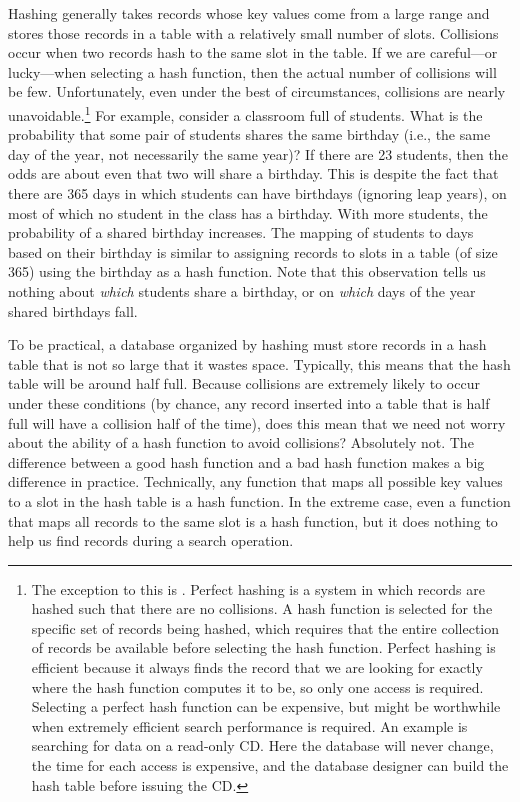 Hashing generally takes records whose key values come from a
large range and stores those records in a table
with a relatively small number of slots.
Collisions occur when two records hash to the same slot in the
table.
If we are careful---or lucky---when selecting a hash function, then
the actual number of collisions will be few.
Unfortunately, even under the best of circumstances, collisions are
nearly unavoidable.\footnote{The exception to this is .
Perfect hashing is a system in which records are hashed such that
there are no collisions.
A hash function is selected for the specific set
of records being hashed, which requires that the entire collection of
records be available before selecting the hash function.
Perfect hashing is efficient because it always finds the record that
we are looking for exactly where the hash function computes it to
be, so only one access is required.
Selecting a perfect hash function can be expensive, but might be
worthwhile when extremely efficient search performance is required.
An example is searching for data on a read-only CD.
Here the database will never change, the time for each access is
expensive, and the database designer can build the hash table before
issuing the CD.}
For example, consider a classroom full of students.
What is the probability that some pair of students
shares the same birthday (i.e., the same day of the year, not
necessarily the same year)?
If there are 23 students, then the odds are about even that two will
share a birthday.
This is despite the fact that there are 365 days in which students
can have birthdays (ignoring leap years), on most of which no student
in the class has a birthday.
With more students, the probability of a shared birthday increases.
The mapping of students to days based on their birthday is similar to
assigning records to slots in a table (of size 365) using the
birthday as a hash function.
Note that this observation tells us nothing about \emph{which}
students share a birthday, or on \emph{which} days of the year shared
birthdays fall.

To be practical, a database organized by hashing must store records in a
hash table that is not so large that it wastes space.
Typically, this means that the hash table will be around half full.
Because collisions are extremely likely to occur under these
conditions (by chance, any record inserted into a table that is half
full will have a collision half of the time),
does this mean that we need not worry about the ability of a
hash function to avoid collisions?
Absolutely not.
The difference between a good hash function and a bad hash function
makes a big difference in practice.
Technically, any function that maps all possible key values to a
slot in the hash table is a hash function.
In the extreme case, even a function that maps all records to the same 
slot is a hash function, but it does nothing to help us
find records during a search operation.

